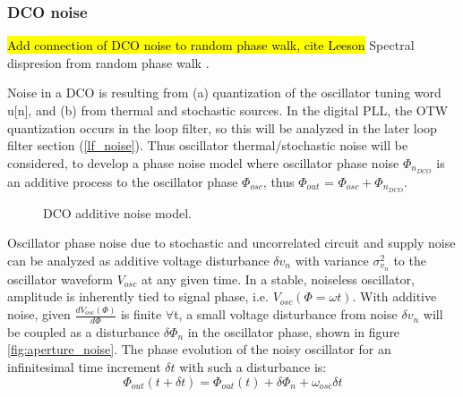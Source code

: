 \subsubsection{DCO noise}\label{dco_noise}
	\hl{Add connection of DCO noise to random phase walk, cite Leeson}
	Spectral dispresion from random phase walk \cite{vannicola_varshney_1983}.

	Noise in a DCO is resulting from (a) quantization of the oscillator tuning word u[n], and (b) from thermal and stochastic sources. In the digital PLL, the OTW quantization occurs in the loop filter, so this will be analyzed in the later loop filter section (\ref{lf_noise}). Thus oscillator thermal/stochastic noise will be considered, to develop a phase noise model where oscillator phase noise $\Phi_{n_{DCO}}$ is an additive process to the oscillator phase $\Phi_{osc}$, thus $\Phi_{out}$ = $\Phi_{osc} + \Phi_{n_{DCO}}$.

	\begin{figure}[htb!]
		\center
		\caption{DCO additive noise model.}
		\label{fig:dco_noise}
	\end{figure}
	\FloatBarrier

	 Oscillator phase noise due to stochastic and uncorrelated circuit and supply noise can be analyzed as additive voltage disturbance $\delta v_n$ with variance $\sigma_{v_n}^2$ to the oscillator waveform $V_{osc}$ at any given time.  In a stable, noiseless oscillator, amplitude is inherently tied to signal phase, i.e. $V_{osc}(\Phi=\omega t)$. With additive noise, given $\frac{dV_{osc}(\Phi)}{d\Phi}$ is finite $\forall$t, a small voltage disturbance from noise $\delta v_{n}$ will be coupled as a disturbance $\delta\Phi_{n}$ in the oscillator phase, shown in figure \ref{fig:aperture_noise}. The phase evolution of the noisy oscillator for an infinitesimal time increment $\delta t$  with such a disturbance is:
	 \begin{equation}
		\Phi_{out}(t+\delta t) = \Phi_{out}(t) + \delta\Phi_n + \omega_{osc}\delta t \label{eq:rwalk_ph}
	 \end{equation}

